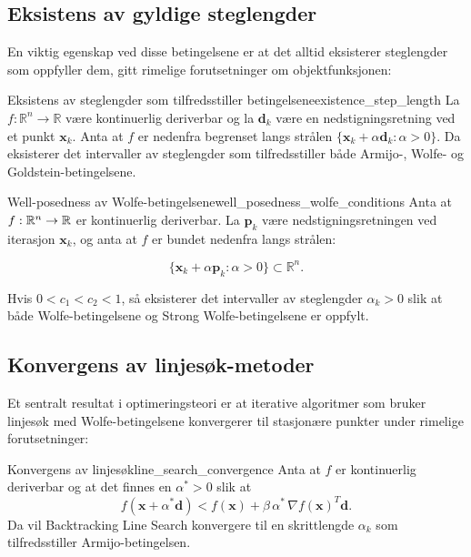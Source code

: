 \subsection{Eksistens av gyldige steglengder}
\label{subsec:existence_step_length}

En viktig egenskap ved disse betingelsene er at det alltid eksisterer steglengder som oppfyller dem, gitt rimelige forutsetninger om objektfunksjonen:

\begin{theorem}{Eksistens av steglengder som tilfredsstiller betingelsene}{existence_step_length}
	La $f: \mathbb{R}^n \to \mathbb{R}$ være kontinuerlig deriverbar og la $\symbf{d}_k$ være en nedstigningsretning ved et punkt $\symbf{x}_k$. Anta at $f$ er nedenfra begrenset langs strålen $\{\symbf{x}_k + \alpha\symbf{d}_k : \alpha > 0\}$. Da eksisterer det intervaller av steglengder som tilfredsstiller både Armijo-, Wolfe- og Goldstein-betingelsene.
\end{theorem}

\begin{lemma}{Well-posedness av Wolfe-betingelsene}{well_posedness_wolfe_conditions}
	Anta at \(f:\mathbb{R}^n \to \mathbb{R} \) er kontinuerlig deriverbar. La \(\mathbf{p}_k\) være nedstigningsretningen ved iterasjon \(\mathbf{x}_k\), og anta at \(f\) er bundet nedenfra langs strålen:

	\[
		\{\mathbf{x}_k + \alpha \mathbf{p}_k : \alpha > 0\} \subset \mathbb{R}^n.
	\]

	Hvis \(0 < c_1 < c_2 < 1\), så eksisterer det intervaller av steglengder \(\alpha_k > 0\) slik at både Wolfe-betingelsene og Strong Wolfe-betingelsene er oppfylt.
\end{lemma}

\subsection{Konvergens av linjesøk-metoder}
\label{subsec:convergence_line_search}

Et sentralt resultat i optimeringsteori er at iterative algoritmer som bruker linjesøk med Wolfe-betingelsene konvergerer til stasjonære punkter under rimelige forutsetninger:

\begin{theorem}{Konvergens av linjesøk}{line_search_convergence}
	Anta at \(f\) er kontinuerlig deriverbar og at det finnes en \(\alpha^\ast > 0\) slik at
	\[
		f(\symbf{x} + \alpha^\ast \symbf{d}) < f(\symbf{x}) + \beta\,\alpha^\ast\,\nabla f(\symbf{x})^T \symbf{d}.
	\]
	Da vil Backtracking Line Search konvergere til en skrittlengde \(\alpha_k\) som tilfredsstiller Armijo-betingelsen.
\end{theorem}

